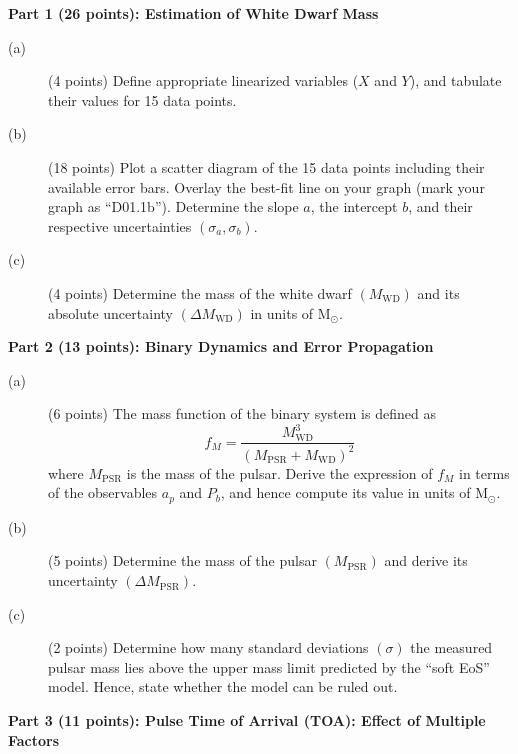 \medskip\noindent\textbf{Part 1 (26 points): Estimation of White Dwarf Mass}

\begin{description}
\item[(a)] (4 points) Define appropriate linearized variables ($X$ and $Y$),
  and tabulate their values for 15 data points.
\item[(b)] (18 points) Plot a scatter diagram of the 15 data points including
  their available error bars. Overlay the best-fit line on your graph (mark
  your graph as ``D01.1b''). Determine the slope $a$, the intercept $b$, and
  their respective uncertainties $(\sigma_a, \sigma_b)$.
\item[(c)] (4 points) Determine the mass of the white dwarf
  $(M_{\mathrm{WD}})$ and its absolute uncertainty $(\Delta M_{\mathrm{WD}})$
  in units of $\mathrm{M}_\odot$.
\end{description}

\medskip\noindent\textbf{Part 2 (13 points): Binary Dynamics and Error Propagation}

\begin{description}
\item[(a)] (6 points) The mass function of the binary system is defined as
  \[
  f_M = \frac{M_{\mathrm{WD}}^3}{\left(M_{\mathrm{PSR}} + M_{\mathrm{WD}}\right)^2}
  \]
  where $M_{\mathrm{PSR}}$ is the mass of the pulsar. Derive the expression of
  $f_M$ in terms of the observables $a_p$ and $P_b$, and hence compute its
  value in units of $\mathrm{M}_\odot$.
\item[(b)] (5 points) Determine the mass of the pulsar $(M_{\mathrm{PSR}})$
  and derive its uncertainty $(\Delta M_{\mathrm{PSR}})$.
\item[(c)] (2 points) Determine how many standard deviations $(\sigma)$ the
  measured pulsar mass lies above the upper mass limit predicted by the
  ``soft EoS'' model. Hence, state whether the model can be ruled out.
\end{description}

\medskip\noindent\textbf{Part 3 (11 points): Pulse Time of Arrival (TOA): Effect of Multiple Factors}

